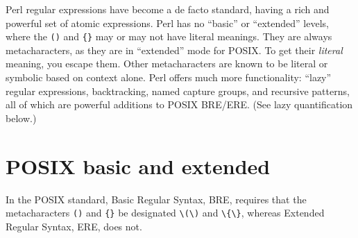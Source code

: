 Perl regular expressions have become a de facto standard, having a
rich and powerful set of atomic expressions. Perl has no ``basic'' or
``extended'' levels, where the \verb|()| and \verb|{}| may or may not
have literal meanings. They are always metacharacters, as they are in
``extended'' mode for POSIX. To get their \textsl{literal} meaning,
you escape them. Other metacharacters are known to be literal or
symbolic based on context alone. Perl offers much more functionality:
``lazy'' regular expressions, backtracking, named capture groups, and
recursive patterns, all of which are powerful additions to POSIX
BRE/ERE. (See lazy quantification below.)

\section{POSIX basic and extended}
In the POSIX standard, Basic Regular Syntax, BRE, requires that the
metacharacters \verb|()| and \verb|{}| be designated \verb|\(\)| and 
\verb|\{\}|, whereas Extended Regular Syntax, ERE, does not.


